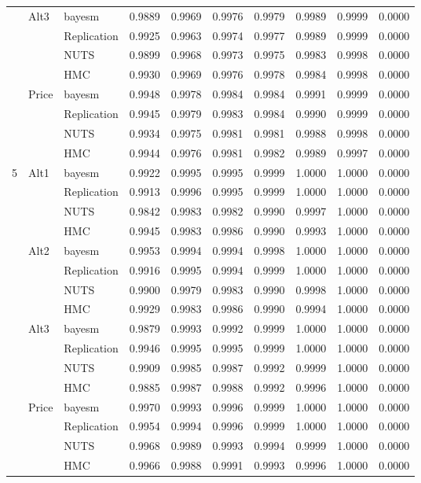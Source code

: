\begin{longtable}{cllccccccc}
 & Alt3 & bayesm & 0.9889 & 0.9969 & 0.9976 & 0.9979 & 0.9989 & 0.9999 & 0.0000 \\
 &  & Replication & 0.9925 & 0.9963 & 0.9974 & 0.9977 & 0.9989 & 0.9999 & 0.0000 \\
 &  & NUTS & 0.9899 & 0.9968 & 0.9973 & 0.9975 & 0.9983 & 0.9998 & 0.0000 \\
 &  & HMC & 0.9930 & 0.9969 & 0.9976 & 0.9978 & 0.9984 & 0.9998 & 0.0000 \\
 & Price & bayesm & 0.9948 & 0.9978 & 0.9984 & 0.9984 & 0.9991 & 0.9999 & 0.0000 \\
 &  & Replication & 0.9945 & 0.9979 & 0.9983 & 0.9984 & 0.9990 & 0.9999 & 0.0000 \\
 &  & NUTS & 0.9934 & 0.9975 & 0.9981 & 0.9981 & 0.9988 & 0.9998 & 0.0000 \\
 &  & HMC & 0.9944 & 0.9976 & 0.9981 & 0.9982 & 0.9989 & 0.9997 & 0.0000 \\
5 & Alt1 & bayesm & 0.9922 & 0.9995 & 0.9995 & 0.9999 & 1.0000 & 1.0000 & 0.0000 \\
 &  & Replication & 0.9913 & 0.9996 & 0.9995 & 0.9999 & 1.0000 & 1.0000 & 0.0000 \\
 &  & NUTS & 0.9842 & 0.9983 & 0.9982 & 0.9990 & 0.9997 & 1.0000 & 0.0000 \\
 &  & HMC & 0.9945 & 0.9983 & 0.9986 & 0.9990 & 0.9993 & 1.0000 & 0.0000 \\
 & Alt2 & bayesm & 0.9953 & 0.9994 & 0.9994 & 0.9998 & 1.0000 & 1.0000 & 0.0000 \\
 &  & Replication & 0.9916 & 0.9995 & 0.9994 & 0.9999 & 1.0000 & 1.0000 & 0.0000 \\
 &  & NUTS & 0.9900 & 0.9979 & 0.9983 & 0.9990 & 0.9998 & 1.0000 & 0.0000 \\
 &  & HMC & 0.9929 & 0.9983 & 0.9986 & 0.9990 & 0.9994 & 1.0000 & 0.0000 \\
 & Alt3 & bayesm & 0.9879 & 0.9993 & 0.9992 & 0.9999 & 1.0000 & 1.0000 & 0.0000 \\
 &  & Replication & 0.9946 & 0.9995 & 0.9995 & 0.9999 & 1.0000 & 1.0000 & 0.0000 \\
 &  & NUTS & 0.9909 & 0.9985 & 0.9987 & 0.9992 & 0.9999 & 1.0000 & 0.0000 \\
 &  & HMC & 0.9885 & 0.9987 & 0.9988 & 0.9992 & 0.9996 & 1.0000 & 0.0000 \\
 & Price & bayesm & 0.9970 & 0.9993 & 0.9996 & 0.9999 & 1.0000 & 1.0000 & 0.0000 \\
 &  & Replication & 0.9954 & 0.9994 & 0.9996 & 0.9999 & 1.0000 & 1.0000 & 0.0000 \\
 &  & NUTS & 0.9968 & 0.9989 & 0.9993 & 0.9994 & 0.9999 & 1.0000 & 0.0000 \\
 &  & HMC & 0.9966 & 0.9988 & 0.9991 & 0.9993 & 0.9996 & 1.0000 & 0.0000 \\
\end{longtable}
